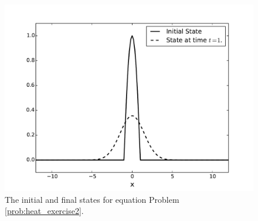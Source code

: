 \begin{figure}
\centering
\includegraphics[width=\textwidth]{heatexercise2.pdf}
\caption{The initial and final states for equation Problem \ref{prob:heat_exercise2}.}
\label{fig:heatexercise2}
\end{figure}

